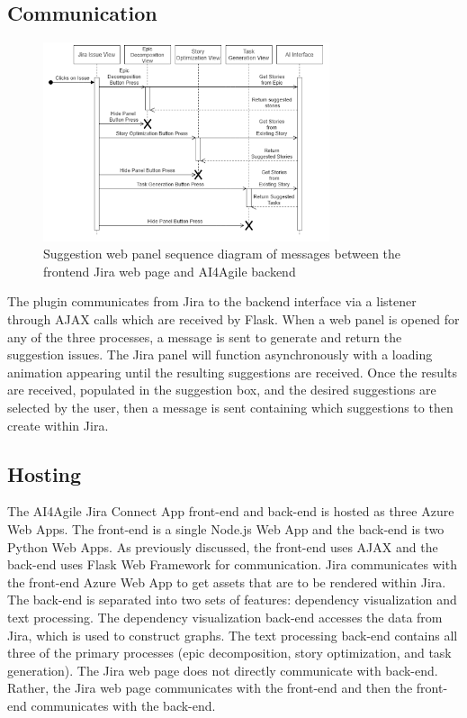 \subsection{Communication}
\begin{figure}
\centering
\includegraphics[width=0.75\textwidth,keepaspectratio]{./figure/SequenceFlowDiagram.png}
\caption{Suggestion web panel sequence diagram of messages between the frontend Jira web page and AI4Agile backend}
\end{figure}

The plugin communicates from Jira to the backend interface via a listener through AJAX calls which are received by Flask. When a web panel is opened for any of the three processes, a message is sent to generate and return the suggestion issues. The Jira panel will function asynchronously with a loading animation appearing until the resulting suggestions are received. Once the results are received, populated in the suggestion box, and the desired suggestions are selected by the user, then a message is sent containing which suggestions to then create within Jira.

\subsection{Hosting}
\label{hosting}

The AI4Agile Jira Connect App front-end and back-end is hosted as three Azure Web Apps. The front-end is a single Node.js Web App and the back-end is two Python Web Apps. As previously discussed, the front-end uses AJAX and the back-end uses Flask Web Framework for communication. Jira communicates with the front-end Azure Web App to get assets that are to be rendered within Jira. The back-end is separated into two sets of features: dependency visualization and text processing. The dependency visualization back-end accesses the data from Jira, which is used to construct graphs. The text processing back-end contains all three of the primary processes (epic decomposition, story optimization, and task generation). The Jira web page does not directly communicate with back-end. Rather, the Jira web page communicates with the front-end and then the front-end communicates with the back-end.

